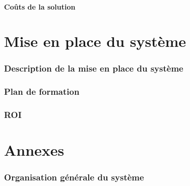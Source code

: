 \subsection{Coûts de la solution}

\part{Mise en place du système}

\section{Description de la mise en place du système}

\section{Plan de formation}

\section{ROI}

\part{Annexes}

\section{Organisation générale du système}
